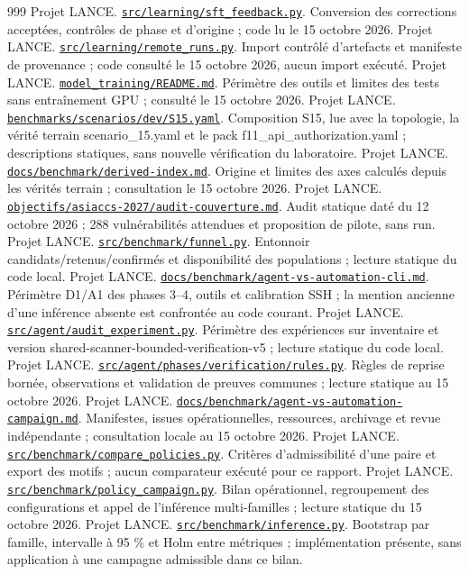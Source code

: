 \documentclass[11pt,a4paper]{article}
\newcommand{\source}[2]{\href{../../#1}{\nolinkurl{#1}}. #2}
\begin{document}
\begin{thebibliography}{999}
 Projet LANCE. \source{src/learning/sft_feedback.py}{Conversion des corrections acceptées, contrôles de phase et d'origine ; code lu le 15 octobre 2026.}
 Projet LANCE. \source{src/learning/remote_runs.py}{Import contrôlé d'artefacts et manifeste de provenance ; code consulté le 15 octobre 2026, aucun import exécuté.}
 Projet LANCE. \source{model_training/README.md}{Périmètre des outils et limites des tests sans entraînement GPU ; consulté le 15 octobre 2026.}
 Projet LANCE. \source{benchmarks/scenarios/dev/S15.yaml}{Composition S15, lue avec la topologie, la vérité terrain scenario\_15.yaml et le pack f11\_api\_authorization.yaml ; descriptions statiques, sans nouvelle vérification du laboratoire.}
 Projet LANCE. \source{docs/benchmark/derived-index.md}{Origine et limites des axes calculés depuis les vérités terrain ; consultation le 15 octobre 2026.}
 Projet LANCE. \source{objectifs/asiaccs-2027/audit-couverture.md}{Audit statique daté du 12 octobre 2026 ; 288 vulnérabilités attendues et proposition de pilote, sans run.}
 Projet LANCE. \source{src/benchmark/funnel.py}{Entonnoir candidats/retenus/confirmés et disponibilité des populations ; lecture statique du code local.}
 Projet LANCE. \source{docs/benchmark/agent-vs-automation-cli.md}{Périmètre D1/A1 des phases 3--4, outils et calibration SSH ; la mention ancienne d'une inférence absente est confrontée au code courant.}
 Projet LANCE. \source{src/agent/audit_experiment.py}{Périmètre des expériences sur inventaire et version shared-scanner-bounded-verification-v5 ; lecture statique du code local.}
 Projet LANCE. \source{src/agent/phases/verification/rules.py}{Règles de reprise bornée, observations et validation de preuves communes ; lecture statique au 15 octobre 2026.}
 Projet LANCE. \source{docs/benchmark/agent-vs-automation-campaign.md}{Manifestes, issues opérationnelles, ressources, archivage et revue indépendante ; consultation locale au 15 octobre 2026.}
 Projet LANCE. \source{src/benchmark/compare_policies.py}{Critères d'admissibilité d'une paire et export des motifs ; aucun comparateur exécuté pour ce rapport.}
 Projet LANCE. \source{src/benchmark/policy_campaign.py}{Bilan opérationnel, regroupement des configurations et appel de l'inférence multi-familles ; lecture statique du 15 octobre 2026.}
 Projet LANCE. \source{src/benchmark/inference.py}{Bootstrap par famille, intervalle à 95 \% et Holm entre métriques ; implémentation présente, sans application à une campagne admissible dans ce bilan.}

\end{thebibliography}
\end{document}
